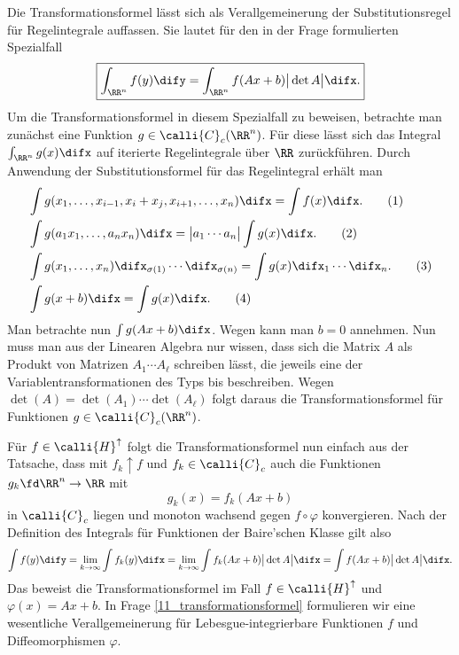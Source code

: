 \begin{antwort}
  Die Transformationsformel lässt sich als Verallgemeinerung 
  der Substitutionsregel für Regelintegrale auffassen. 
  Sie lautet für den in der Frage formulierten Spezialfall 
  \[
  \boxed{
    \int_{\RR^n} f(y) \dify = 
    \int_{\RR^n} f(Ax+b) \big| \det A \big| \difx.
  }
  \]   
  Um die Transformationsformel in diesem Spezialfall zu beweisen, 
  betrachte man zunächst eine Funktion $g\in \calli{C}_c(\RR^n)$. 
  Für diese lässt sich das Integral $\int_{\RR^n} g(x) \difx$ 
  auf iterierte Regelintegrale über $\RR$ zurückführen. 
  Durch Anwendung der Substitutionsformel für das Regelintegral erhält man 
  \begin{align}
    &\int g(x_1,\ldots, x_{i-1}, x_i+x_j, x_{i+1}, \ldots, x_n ) 
    \difx = \int f(x) \difx. \tag{1}\\
    &\int g(a_1 x_1,\ldots, a_n x_n ) 
    \difx = \big| a_1\cdots a_n \big| \int g(x) \difx. \tag{2}\\
    &\int g(x_1,\ldots, x_n ) \difx_{\sigma(1)} \cdots \difx_{\sigma(n)} 
    = \int g(x) \difx_1\cdots \difx_n. \tag{3}\\
    &\int g(x+b)\difx =\int g(x) \difx.\tag{4}
  \end{align}
  Man betrachte nun $\int g( Ax+b) \difx$. Wegen  kann man 
  {\oBdA} $b=0$ annehmen. Nun muss man aus der Linearen Algebra nur wissen, 
  dass sich die Matrix $A$ als Produkt von Matrizen $A_1 \cdots A_\ell$ 
  schreiben lässt, die jeweils eine der Variablentransformationen 
  des Typs  bis  beschreiben. 
  Wegen $\det(A)=\det(A_1)\cdots \det(A_\ell)$ folgt daraus 
  die Transformationsformel für Funktionen $g\in \calli{C}_c (\RR^n)$. 

  Für $f\in \calli{H}^\uparrow$ folgt die Transformationsformel nun 
  einfach aus der Tatsache, dass mit $f_k \uparrow f$ und 
  $f_k \in \calli{C}_c$ auch die Funktionen $g_k\fd\RR^n\to\RR$ mit 
  \[
  g_k (x) = f_k(Ax+b)
  \]
  in $\calli{C}_c$ liegen und monoton wachsend gegen $f\circ\varphi$ 
  konvergieren. Nach der Definition des Integrals für 
  Funktionen der Baire'schen 
  Klasse gilt also
  \[
  \int f (y) \dify = 
  \lim_{k\to\infty} \int f_k(y) \difx = 
  \lim_{k\to\infty} \int f_k(Ax+b) \big|\det A \big|  \difx  = 
  \int  f (Ax+b) \big|\det A \big|  \difx.
  \]
  Das beweist die Transformationsformel im Fall 
  $f\in \calli{H}^\uparrow$ und $\varphi(x)=Ax+b$. In Frage 
  \ref{11_transformationsformel} 
  formulieren wir eine wesentliche Verallgemeinerung für 
  Lebesgue-integrierbare Funktionen $f$ und Diffeomorphismen $\varphi$. 
  \AntEnd  
\end{antwort} 

